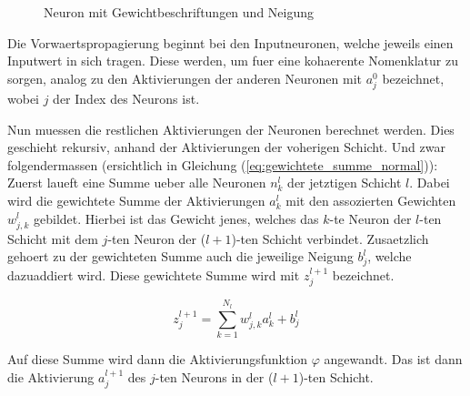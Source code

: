 \begin{figure}[h!]

  \caption{Neuron mit Gewichtbeschriftungen und Neigung}
\end{figure}


\par\bigskip
Die Vorwaertspropagierung beginnt bei den Inputneuronen, welche jeweils
einen Inputwert in sich tragen. Diese werden, um fuer eine kohaerente Nomenklatur zu sorgen,
analog zu den Aktivierungen der anderen Neuronen mit $a_j^0$ bezeichnet, wobei
$j$ der Index des Neurons ist.\par
Nun muessen die restlichen Aktivierungen der Neuronen berechnet werden. Dies geschieht rekursiv, anhand der
Aktivierungen der voherigen Schicht. Und zwar folgendermassen (ersichtlich in
Gleichung (\ref{eq:gewichtete_summe_normal})): \\
Zuerst laueft eine Summe ueber alle Neuronen $n_k^{l}$ der jetztigen Schicht
$l$. Dabei wird die gewichtete Summe der Aktivierungen $a_k^{l}$ mit den
assozierten Gewichten $w_{j,k}^l$ gebildet. Hierbei ist das Gewicht jenes, welches das
$k$-te Neuron der $l$-ten Schicht mit dem $j$-ten Neuron der ($l+1$)-ten Schicht verbindet.
Zusaetzlich gehoert zu der gewichteten Summe auch die jeweilige Neigung $b_j^l$, welche
dazuaddiert wird. Diese gewichtete Summe wird mit $z_j^{l+1}$ bezeichnet.

\begin{equation}\label{eq:gewichtete_summe_normal}
  z_j^{l+1} = \sum_{k=1}^{N_l} w_{j,k}^l a_k^l + b_j^l
\end{equation}

Auf diese Summe wird dann die Aktivierungsfunktion $\varphi$ angewandt.
Das ist dann die Aktivierung $a_j^{l+1}$ des $j$-ten Neurons in der ($l+1$)-ten Schicht.

